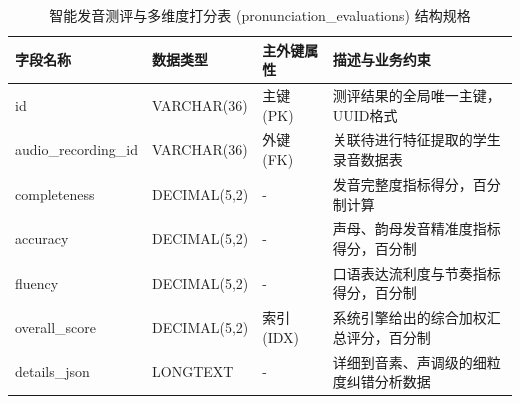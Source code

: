 \begin{table}[H]
\centering
\caption{智能发音测评与多维度打分表 (pronunciation\_evaluations) 结构规格}
\label{tab:db-pronunciation-evaluations}
\begin{tabularx}{\textwidth}{lllX}
\toprule
字段名称 & 数据类型 & 主外键属性 & 描述与业务约束 \\
\midrule
id & VARCHAR(36) & 主键 (PK) & 测评结果的全局唯一主键，UUID格式 \\
audio\_recording\_id & VARCHAR(36) & 外键 (FK) & 关联待进行特征提取的学生录音数据表 \\
completeness & DECIMAL(5,2) & - & 发音完整度指标得分，百分制计算 \\
accuracy & DECIMAL(5,2) & - & 声母、韵母发音精准度指标得分，百分制 \\
fluency & DECIMAL(5,2) & - & 口语表达流利度与节奏指标得分，百分制 \\
overall\_score & DECIMAL(5,2) & 索引 (IDX) & 系统引擎给出的综合加权汇总评分，百分制 \\
details\_json & LONGTEXT & - & 详细到音素、声调级的细粒度纠错分析数据 \\
\bottomrule
\end{tabularx}
\end{table}
